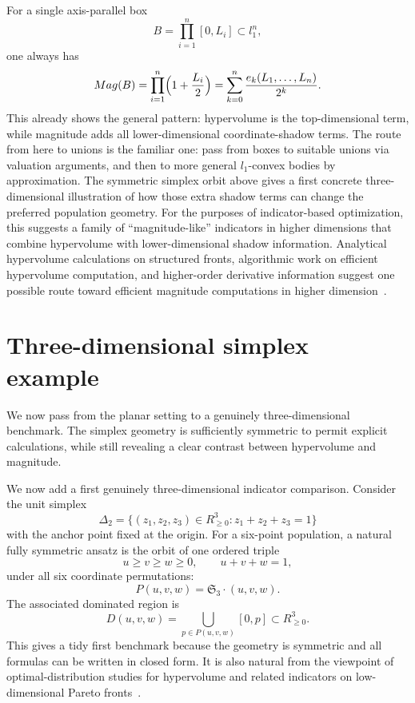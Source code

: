 \documentclass{article}
\def\ell{l}%
\def\Mag{Mag}%
\def\R{R}%
\theoremstyle{definition}
\newcommand{\Mag}{\operatorname{Mag}}
\newcommand{\R}{\mathbb{R}}
\newcommand{\1}{\mathbf{1}}
\begin{document}
For a single axis-parallel box
\[
B=\prod_{i=1}^n [0,L_i]\subset \ell_1^n,
\]
one always has
\[
\Mag(B)=\prod_{i=1}^n\Bigl(1+\frac{L_i}{2}\Bigr)=\sum_{k=0}^n \frac{e_k(L_1,\dots,L_n)}{2^k}.
\]
This already shows the general pattern: hypervolume is the top-dimensional term, while magnitude adds all lower-dimensional coordinate-shadow terms. The route from here to unions is the familiar one: pass from boxes to suitable unions via valuation arguments, and then to more general $\ell_1$-convex bodies by approximation. The symmetric simplex orbit above gives a first concrete three-dimensional illustration of how those extra shadow terms can change the preferred population geometry. For the purposes of indicator-based optimization, this suggests a family of ``magnitude-like'' indicators in higher dimensions that combine hypervolume with lower-dimensional shadow information. Analytical hypervolume calculations on structured fronts, algorithmic work on efficient hypervolume computation, and higher-order derivative information suggest one possible route toward efficient magnitude computations in higher dimension~\cite{Singh2025,GuerreiroFonsecaPaquete2021,DeutzEmmerichWang2023}.


\section{Three-dimensional simplex example}
\label{sec:3dexample}

We now pass from the planar setting to a genuinely three-dimensional benchmark. The simplex geometry is sufficiently symmetric to permit explicit calculations, while still revealing a clear contrast between hypervolume and magnitude.

We now add a first genuinely three-dimensional indicator comparison. Consider the unit simplex
\[
\Delta_2=\{(z_1,z_2,z_3)\in \R_{\ge 0}^3: z_1+z_2+z_3=1\}
\]
with the anchor point fixed at the origin. For a six-point population, a natural fully symmetric ansatz is the orbit of one ordered triple
\[
u\ge v\ge w\ge 0,\qquad u+v+w=1,
\]
under all six coordinate permutations:
\[
P(u,v,w)=\mathfrak S_3\cdot (u,v,w).
\]
The associated dominated region is
\[
D(u,v,w)=\bigcup_{p\in P(u,v,w)} [0,p]\subset \R_{\ge 0}^3.
\]
This gives a tidy first benchmark because the geometry is symmetric and all formulas can be written in closed form. It is also natural from the viewpoint of optimal-distribution studies for hypervolume and related indicators on low-dimensional Pareto fronts~\cite{IshibuchiImadaMasuyamaNojima2019,IshibuchiNanPang2025}.
\end{document}
